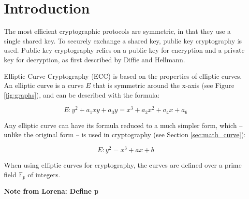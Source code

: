 \section{Introduction}

The most efficient cryptographic protocols are symmetric, in that they use a single shared key.
To securely exchange a shared key, public key cryptography is used. Public key cryptography
relies on a public key for encryption and a private key for decryption, as first described by
Diffie and Hellmann.

Elliptic Curve Cryptography (ECC) is based on the properties of elliptic curves.
An elliptic curve is a curve \(E\) that is symmetric around the x-axis (see Figure \ref{fig:graphs}),
and can be described with the formula:

\begin{equation} \label{eq:elliptic-curve-formula-full}
	E: y^2 + a_1xy + a_3y = x^3 + a_2x^2 + a_4x + a_6
\end{equation}

Any elliptic curve can have its formula reduced to a much simpler form, which -- unlike the original
form -- is used in cryptography (see Section \ref{sec:math_curve}):

\begin{equation}
	E: y^2 = x^3 + ax + b
\end{equation}

When using elliptic curves for cryptography, the curves are defined over a prime field \(\mathbb{F}_p\)
of integers.

\textbf{Note from Lorena: Define p}


